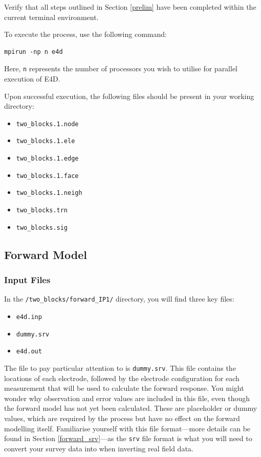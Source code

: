 \documentclass[a4paper,12pt]{article}
\begin{document}
Verify that all steps outlined in Section \ref{prelim} have been completed within the current terminal environment.

To execute the process, use the following command:

\begin{verbatim}
mpirun -np n e4d
\end{verbatim}

Here, \texttt{n} represents the number of processors you wish to utilise for parallel execution of E4D.

Upon successful execution, the following files should be present in your working directory:

\begin{itemize}
    \item \texttt{two\_blocks.1.node}
    \item \texttt{two\_blocks.1.ele}
    \item \texttt{two\_blocks.1.edge}
    \item \texttt{two\_blocks.1.face}
    \item \texttt{two\_blocks.1.neigh}
    \item \texttt{two\_blocks.trn}
    \item \texttt{two\_blocks.sig}
\end{itemize}

\subsection{Forward Model} \label{two_blocks_forward}

\subsubsection{Input Files}

In the \texttt{/two\_blocks/forward\_IP1/} directory, you will find three key files:

\begin{itemize}
    \item \texttt{e4d.inp}
    \item \texttt{dummy.srv}
    \item \texttt{e4d.out}
\end{itemize}

The file to pay particular attention to is \texttt{dummy.srv}. This file contains the locations of each electrode, followed by the electrode configuration for each measurement that will be used to calculate the forward response. You might wonder why observation and error values are included in this file, even though the forward model has not yet been calculated. These are placeholder or dummy values, which are required by the process but have no effect on the forward modelling itself. Familiarise yourself with this file format—more details can be found in Section \ref{forward_srv}—as the \texttt{srv} file format is what you will need to convert your survey data into when inverting real field data. 
\end{document}
